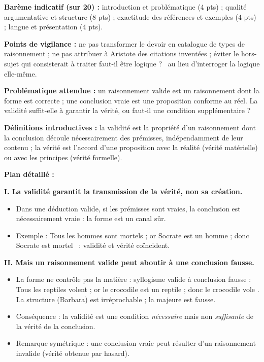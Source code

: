 \documentclass[11pt]{article}
\newcommand{\cle}[1]{{\popxbold\color{popdark}#1}}
\begin{document}
\begin{corrige}
\textbf{Barème indicatif (sur 20) :} introduction et problématique (4 pts) ; qualité argumentative et structure (8 pts) ; exactitude des références et exemples (4 pts) ; langue et présentation (4 pts).

\textbf{Points de vigilance :} ne pas transformer le devoir en catalogue de types de raisonnement ; ne pas attribuer à Aristote des citations inventées ; éviter le hors-sujet qui consisterait à traiter \guillemotleft faut-il être logique ? \guillemotright\ au lieu d'interroger la logique elle-même.
\end{corrige}

\begin{corrige}
\textbf{Problématique attendue :} un raisonnement valide est un raisonnement dont la forme est correcte ; une conclusion vraie est une proposition conforme au réel. La validité suffit-elle à garantir la vérité, ou faut-il une condition supplémentaire ?

\textbf{Définitions introductives :} la \cle{validité} est la propriété d'un raisonnement dont la conclusion découle nécessairement des prémisses, indépendamment de leur contenu ; la \cle{vérité} est l'accord d'une proposition avec la réalité (vérité matérielle) ou avec les principes (vérité formelle).

\textbf{Plan détaillé :}

\textbf{I. La validité garantit la transmission de la vérité, non sa création.}
\begin{itemize}
\item Dans une déduction valide, si les prémisses sont vraies, la conclusion est nécessairement vraie : la forme est un canal sûr.
\item Exemple : \guillemotleft Tous les hommes sont mortels ; or Socrate est un homme ; donc Socrate est mortel \guillemotright\ : validité et vérité coïncident.
\end{itemize}

\textbf{II. Mais un raisonnement valide peut aboutir à une conclusion fausse.}
\begin{itemize}
\item La forme ne contrôle pas la matière : syllogisme valide à conclusion fausse : \guillemotleft Tous les reptiles volent ; or le crocodile est un reptile ; donc le crocodile vole \guillemotright. La structure (Barbara) est irréprochable ; la majeure est fausse.
\item Conséquence : la validité est une condition \emph{nécessaire} mais non \emph{suffisante} de la vérité de la conclusion.
\item Remarque symétrique : une conclusion vraie peut résulter d'un raisonnement invalide (vérité obtenue par hasard).
\end{itemize}


\end{corrige}
\end{document}
